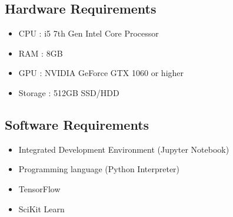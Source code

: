 \documentclass[12pt,a4paper]{report}     %
\begin{document}
\begin{normalsize}
{%
\subsection{Hardware Requirements}
\begin{itemize}
    \item CPU : i5 7th Gen Intel Core Processor
    \item RAM : 8GB 
    \item GPU : NVIDIA GeForce GTX 1060 or higher 
    \item Storage : 512GB SSD/HDD
\end{itemize}


\subsection{Software Requirements}
\begin{itemize}
    \item Integrated Development Environment (Jupyter Notebook)
    \item Programming language (Python Interpreter)
    \item TensorFlow
    \item SciKit Learn

\end{itemize}


}



\end{normalsize}
\end{document}
